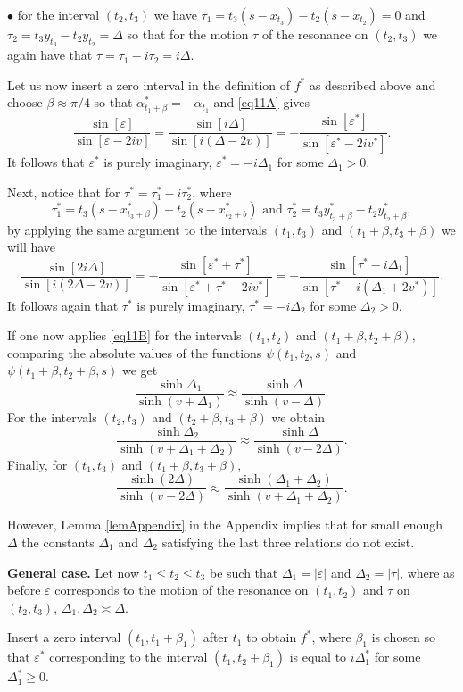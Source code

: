 \documentclass[11pt,twoside,reqno]{amsart}
\def\DD{{\mathcal{D}}}
\def\e{\varepsilon}
\def\DD{\Delta}
\def\a{\alpha}
\def\b{\beta}
\theoremstyle{plain}
\numberwithin{equation}{section}
\begin{document}
$\bullet$ for the interval $(t_2,t_3)$ we have $\tau_1=t_3(s-x_{t_3})-t_2(s-x_{t_2})=0$ and $\tau_2=t_3y_{t_3}-t_2y_{t_2}=\DD$ so that for the motion $\tau$ of the resonance on $(t_2,t_3)$
we again have that $\tau=\tau_1-i\tau_2=i\DD$.  

Let us now insert a zero  interval in the definition of $f^*$ as described above and choose $\beta\approx\pi/4$ so that 
$\a^*_{t_1+\b}=-\a_{t_1}$ and 
\eqref{eq11A} gives
$$\frac{\sin[\e]}{\sin[\e   - 2iv] }=\frac{\sin[i\DD]}{\sin[i(\DD   - 2v)] }=-\frac{\sin[\e^{*}]}{\sin[\e^{*}   - 2iv^*] }.$$
It follows that $\e^*$ is purely imaginary,  $\e^*= -i\DD_1$ for some $\DD_1>0$.

Next, notice that for $\tau^*=\tau^*_1-i\tau^*_2$, where 
$$\tau^*_1=t_3(s-x^*_{t_3+\b})-t_2(s-x^*_{t_2+b})\text{ and }\tau^*_2=t_3y^*_{t_3+\b}-t_2y^*_{t_2+\b},$$
by applying the same argument to the intervals $(t_1,t_3)$ and $(t_1+\b,t_3+\b)$ we will  have 
$$\frac{\sin[2i\DD]}{\sin[i(2\DD   - 2v)] }=-\frac{\sin[\e^*+\tau^{*}]}{\sin[\e^{*} +\tau^*  - 2iv^*] }
=-\frac{\sin[\tau^{*}-i\DD_1]}{\sin[\tau^*   -i(\DD_1+2v^*)] }.$$
It follows again that $\tau^*$ is purely imaginary, $\tau^*=-i\DD_2$ for some $\DD_2>0$. 

If one now applies  \eqref{eq11B} for the intervals $(t_1,t_2)$ and  $(t_1+\b,t_2+\b)$, comparing the absolute values of 
the functions $\psi(t_1,t_2,s)$ and $\psi(t_1+\b,t_2+\b,s)$ we get
\[
\frac{\sinh \Delta_1}{\sinh(v+\Delta_1)}
\approx\frac{\sinh \Delta}{\sinh(v-\Delta)}.
\]
For the intervals $(t_2,t_3)$ and  $(t_2+\b,t_3+\b)$ we obtain 
\[
\frac{\sinh \Delta_2}{\sinh(v+\Delta_1+\Delta_2)}
\approx \frac{\sinh \Delta}{\sinh(v-2\Delta)}.
\]
 Finally, for $(t_1,t_3)$ and  $(t_1+\b,t_3+\b)$,
 	\[
 \frac{\sinh(2\Delta)}{\sinh(v-2\Delta)}
 \approx
 \frac{\sinh(\Delta_1+\Delta_2)}{\sinh(v+\Delta_1+\Delta_2)} .
 \]
 
 However, Lemma \ref{lemAppendix} in the Appendix implies that for small enough $\DD$ the constants $\DD_1$ and $\DD_2$ satisfying the last three relations do not exist.

{\bf General case.} Let now $t_1\leq t_2\leq t_3$ be such that $\DD_1=|\e|$ and $\DD_2=|\tau|$, where as before $\e$ corresponds to the motion of the resonance on $(t_1,t_2)$ and $\tau$ on $(t_2,t_3)$, $\DD_1,\DD_2\asymp \DD$. 

Insert a zero interval $(t_1,t_1+\b_1)$ after $t_1$ to obtain $f^*$, where $\b_1$ is chosen so  that $\e^*$
corresponding to the interval $(t_1,t_2+\b_1)$ is equal to $i\DD_1^*$ for some $\DD_1^*\geq 0$. 
\end{document}
